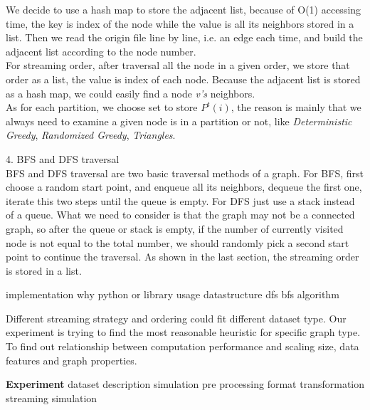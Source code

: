 \documentclass[12pt]{article}
\begin{document}
We decide to use a hash map to store the adjacent list, because of O(1) accessing time, the key is index of the node while the value is all its neighbors stored in a list. Then we read the origin file line by line, i.e. an edge each time, and build the adjacent list according to the node number.\\
For streaming order, after traversal all the node in a given order, we store that order as a list, the value is index of each node. Because the adjacent list is stored as a hash map, we could easily find a node \emph{v's} neighbors.\\
As for each partition, we choose set to store $P^{t}(i)$, the reason is mainly that we always need to examine a given node is in a partition or not, like \emph{Deterministic Greedy}, \emph{Randomized Greedy}, \emph{Triangles}.

4. BFS and DFS traversal\\
BFS and DFS traversal are two basic traversal methods of a graph. For BFS, first choose a random start point, and enqueue all its neighbors, dequeue the first one, iterate this two steps until the queue is empty. For DFS just use a stack instead of a queue. What we need to consider is that the graph may not be a connected graph, so after the queue or stack is empty, if the number of currently visited node is not equal to the total number, we should randomly pick a second start point to continue the traversal. As shown in the last section, the streaming order is stored in a list.


implementation
	why python or library usage
	datastructure
	dfs bfs algorithm



Different streaming strategy and ordering could fit different dataset type. Our experiment is trying to find the most reasonable heuristic for specific graph type. To find out relationship between computation performance and scaling size, data features and graph properties.

\textbf{Experiment}
dataset description
simulation
	pre processing
	format transformation
	streaming simulation
\end{document}
